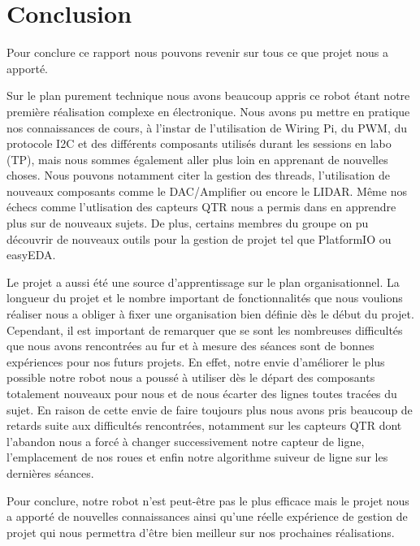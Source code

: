 
\chapter{Conclusion}

Pour conclure ce rapport nous pouvons revenir sur tous ce que projet nous a apporté.

Sur le plan purement technique nous avons beaucoup appris ce robot étant notre première réalisation complexe en électronique. Nous avons pu mettre en pratique nos connaissances de cours, à l'instar de l'utilisation de Wiring Pi, du PWM, du protocole I2C et des différents composants utilisés durant les sessions en labo (TP), mais nous sommes également aller plus loin en apprenant de nouvelles choses. Nous pouvons notamment citer la gestion des threads, l'utilisation de nouveaux composants comme le DAC/Amplifier ou encore le LIDAR. Même nos échecs comme l'utlisation des capteurs QTR nous a permis dans en apprendre plus sur de nouveaux sujets. De plus, certains membres du groupe on pu découvrir de nouveaux outils pour la gestion de projet tel que PlatformIO ou easyEDA.

Le projet a aussi été une source d'apprentissage sur le plan organisationnel. La longueur du projet et le nombre important de fonctionnalités que nous voulions réaliser nous a obliger à fixer une organisation bien définie dès le début du projet. Cependant, il est important de remarquer que se sont les nombreuses difficultés que nous avons rencontrées au fur et à mesure des séances sont de bonnes expériences pour nos futurs projets. En effet, notre envie d'améliorer le plus possible notre robot nous a poussé à utiliser dès le départ des composants totalement nouveaux pour nous et de nous écarter des lignes toutes tracées du sujet. En raison de cette envie de faire toujours plus nous avons pris beaucoup de retards suite aux difficultés rencontrées, notamment sur les capteurs QTR dont l'abandon nous a forcé à changer successivement notre capteur de ligne, l'emplacement de nos roues et enfin notre algorithme suiveur de ligne sur les dernières séances.

Pour conclure, notre robot n'est peut-être pas le plus efficace mais le projet nous a apporté de nouvelles connaissances ainsi qu'une réelle expérience de gestion de projet qui nous permettra d'être bien meilleur sur nos prochaines réalisations.